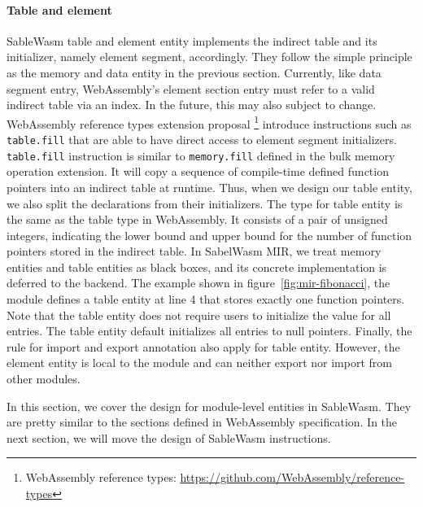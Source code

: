 \paragraph{Table and element} SableWasm table and element entity implements the indirect table and its initializer, namely element segment, accordingly. They follow the simple principle as the memory and data entity in the previous section. Currently, like data segment entry, WebAssembly's element section entry must refer to a valid indirect table via an index. In the future, this may also subject to change. WebAssembly reference types extension proposal \footnote{WebAssembly reference types: \url{https://github.com/WebAssembly/reference-types}} introduce instructions such as \texttt{table.fill} that are able to have direct access to element segment initializers. \texttt{table.fill} instruction is similar to \texttt{memory.fill} defined in the bulk memory operation extension. It will copy a sequence of compile-time defined function pointers into an indirect table at runtime. Thus, when we design our table entity, we also split the declarations from their initializers. The type for table entity is the same as the table type in WebAssembly. It consists of a pair of unsigned integers, indicating the lower bound and upper bound for the number of function pointers stored in the indirect table. In SabelWasm MIR, we treat memory entities and table entities as black boxes, and its concrete implementation is deferred to the backend. The example shown in figure~\ref{fig:mir-fibonacci}, the module defines a table entity at line 4 that stores exactly one function pointers. Note that the table entity does not require users to initialize the value for all entries. The table entity default initializes all entries to null pointers. Finally, the rule for import and export annotation also apply for table entity. However, the element entity is local to the module and can neither export nor import from other modules.

In this section, we cover the design for module-level entities in SableWasm. They are pretty similar to the sections defined in WebAssembly specification. In the next section, we will move the design of SableWasm instructions.